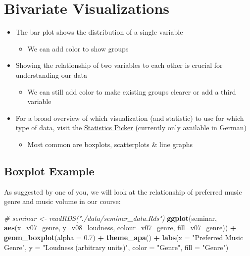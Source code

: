 \documentclass[
]{book}
\newenvironment{Shaded}{\begin{snugshade}}{\end{snugshade}}
\newcommand{\AttributeTok}[1]{\textcolor[rgb]{0.13,0.29,0.53}{#1}}
\newcommand{\CommentTok}[1]{\textcolor[rgb]{0.56,0.35,0.01}{\textit{#1}}}
\newcommand{\FloatTok}[1]{\textcolor[rgb]{0.00,0.00,0.81}{#1}}
\newcommand{\FunctionTok}[1]{\textcolor[rgb]{0.13,0.29,0.53}{\textbf{#1}}}
\newcommand{\NormalTok}[1]{#1}
\newcommand{\SpecialCharTok}[1]{\textcolor[rgb]{0.81,0.36,0.00}{\textbf{#1}}}
\newcommand{\StringTok}[1]{\textcolor[rgb]{0.31,0.60,0.02}{#1}}
\providecommand{\tightlist}{%
  \setlength{\itemsep}{0pt}\setlength{\parskip}{0pt}}
\begin{document}
\section{Bivariate Visualizations}\label{bivariate-visualizations}

\begin{itemize}
\tightlist
\item
  The bar plot shows the distribution of a single variable

  \begin{itemize}
  \tightlist
  \item
    We can add color to show groups
  \end{itemize}
\item
  Showing the relationship of two variables to each other is crucial for understanding our data

  \begin{itemize}
  \tightlist
  \item
    We can still add color to make existing groups clearer or add a third variable
  \end{itemize}
\item
  For a broad overview of which visualization (and statistic) to use for which type of data, visit the \href{https://the-tave.shinyapps.io/Statistics-Picker/}{Statistics Picker} (currently only available in German)

  \begin{itemize}
  \tightlist
  \item
    Most common are boxplots, scatterplots \& line graphs
  \end{itemize}
\end{itemize}

\subsection{Boxplot Example}\label{boxplot-example}

As suggested by one of you, we will look at the relationship of preferred music genre and music volume in our course:

\begin{Shaded}
\begin{Highlighting}[]
\CommentTok{\# seminar \textless{}{-} readRDS("./data/seminar\_data.Rds")}
\FunctionTok{ggplot}\NormalTok{(seminar, }\FunctionTok{aes}\NormalTok{(}\AttributeTok{x=}\NormalTok{v07\_genre, }\AttributeTok{y=}\NormalTok{v08\_loudness, }\AttributeTok{colour=}\NormalTok{v07\_genre, }\AttributeTok{fill=}\NormalTok{v07\_genre)) }\SpecialCharTok{+}
  \FunctionTok{geom\_boxplot}\NormalTok{(}\AttributeTok{alpha =} \FloatTok{0.7}\NormalTok{) }\SpecialCharTok{+} \FunctionTok{theme\_apa}\NormalTok{() }\SpecialCharTok{+}
  \FunctionTok{labs}\NormalTok{(}\AttributeTok{x =} \StringTok{"Preferred Music Genre"}\NormalTok{, }\AttributeTok{y =} \StringTok{"Loudness (arbitrary units)"}\NormalTok{, }
       \AttributeTok{color =} \StringTok{"Genre"}\NormalTok{, }\AttributeTok{fill =} \StringTok{"Genre"}\NormalTok{)}
\end{Highlighting}
\end{Shaded}
\end{document}
